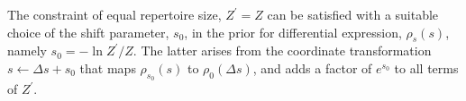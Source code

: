 The constraint of equal repertoire size, $Z^\prime=Z$ can be satisfied with a suitable choice of the shift parameter, $s_0$, in the prior for differential expression, $\rho_{s}(s)$, namely $s_0=-\ln Z^\prime/Z$. The latter arises from the coordinate transformation $s\leftarrow\Delta s+s_0$ that maps $\rho_{s_0}(s)$ to $\rho_{0}(\Delta s)$, and adds a factor of $e^{s_0}$ to all terms of $Z^\prime$.






